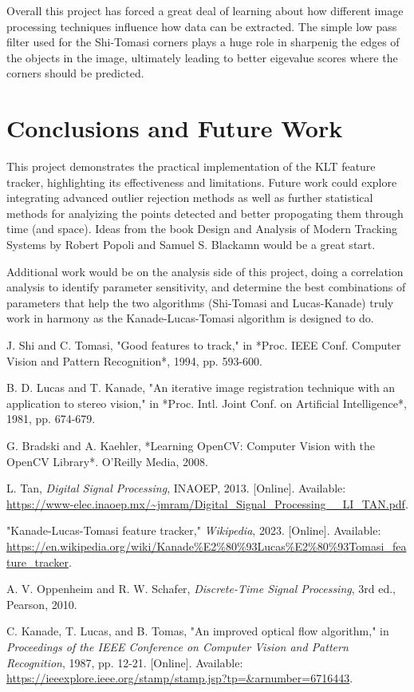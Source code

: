 \documentclass[11pt, conference, letterpaper]{IEEEtran}
\begin{document}
Overall this project has forced a great deal of learning about how different image processing techniques influence how data can be extracted. The simple low pass filter used for the Shi-Tomasi corners plays a huge role in sharpenig the edges of the objects in the image, ultimately leading to better eigevalue scores where the corners should be predicted.

\bigskip

\section{Conclusions and Future Work}
This project demonstrates the practical implementation of the KLT feature tracker, highlighting its effectiveness and limitations. Future work could explore integrating advanced outlier rejection methods as well as further statistical methods for analyizing the points detected and better propogating them through time (and space). Ideas from the book Design and Analysis of Modern Tracking Systems by Robert Popoli and Samuel S. Blackamn would be a great start.

Additional work would be on the analysis side of this project, doing a correlation analysis to identify parameter sensitivity, and determine the best combinations of parameters that help the two algorithms (Shi-Tomasi and Lucas-Kanade) truly work in harmony as the Kanade-Lucas-Tomasi algorithm is designed to do.


\begin{thebibliography}{1}

    J. Shi and C. Tomasi, "Good features to track," in *Proc. IEEE Conf. Computer Vision and Pattern Recognition*, 1994, pp. 593-600.
    
    B. D. Lucas and T. Kanade, "An iterative image registration technique with an application to stereo vision," in *Proc. Intl. Joint Conf. on Artificial Intelligence*, 1981, pp. 674-679.
    
    G. Bradski and A. Kaehler, *Learning OpenCV: Computer Vision with the OpenCV Library*. O'Reilly Media, 2008.
    
    L. Tan, \textit{Digital Signal Processing}, INAOEP, 2013. [Online]. Available: \url{https://www-elec.inaoep.mx/~jmram/Digital_Signal_Processing__LI_TAN.pdf}.
    
    "Kanade-Lucas-Tomasi feature tracker," \textit{Wikipedia}, 2023. [Online]. Available: \url{https://en.wikipedia.org/wiki/Kanade%E2%80%93Lucas%E2%80%93Tomasi_feature_tracker}.
    
    A. V. Oppenheim and R. W. Schafer, \textit{Discrete-Time Signal Processing}, 3rd ed., Pearson, 2010.
    
    C. Kanade, T. Lucas, and B. Tomas, "An improved optical flow algorithm," in \textit{Proceedings of the IEEE Conference on Computer Vision and Pattern Recognition}, 1987, pp. 12-21. [Online]. Available: \url{https://ieeexplore.ieee.org/stamp/stamp.jsp?tp=&arnumber=6716443}.
    
\end{thebibliography}
\end{document}
